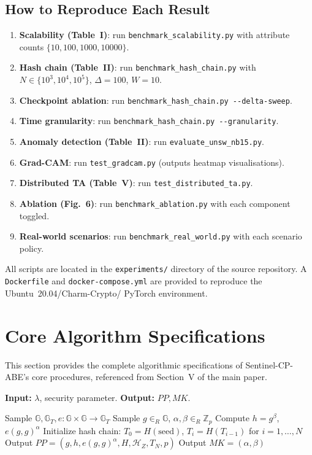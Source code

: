 \documentclass[lettersize,journal]{IEEEtran}
\begin{document}
\subsection{How to Reproduce Each Result}

\begin{enumerate}
    \item \textbf{Scalability (Table~I)}: run \verb|benchmark_scalability.py|
    with attribute counts $\{10,100,1000,10000\}$.
    \item \textbf{Hash chain (Table~II)}: run
    \verb|benchmark_hash_chain.py| with $N \in \{10^3, 10^4, 10^5\}$,
    $\Delta = 100$, $W = 10$.
    \item \textbf{Checkpoint ablation}: run
    \verb|benchmark_hash_chain.py --delta-sweep|.
    \item \textbf{Time granularity}: run
    \verb|benchmark_hash_chain.py --granularity|.
    \item \textbf{Anomaly detection (Table~II)}: run
    \verb|evaluate_unsw_nb15.py|.
    \item \textbf{Grad-CAM}: run \verb|test_gradcam.py|
    (outputs heatmap visualisations).
    \item \textbf{Distributed TA (Table~V)}: run
    \verb|test_distributed_ta.py|.
    \item \textbf{Ablation (Fig.~6)}: run \verb|benchmark_ablation.py|
    with each component toggled.
    \item \textbf{Real-world scenarios}: run
    \verb|benchmark_real_world.py| with each scenario policy.
\end{enumerate}

All scripts are located in the \verb|experiments/| directory of the
source repository. A \verb|Dockerfile| and \verb|docker-compose.yml|
are provided to reproduce the Ubuntu~20.04\slash Charm-Crypto\slash
PyTorch environment.

\section{Core Algorithm Specifications}
\label{sec:algorithms_supp}

This section provides the complete algorithmic specifications of
Sentinel-CP-ABE's core procedures, referenced from Section~V of the
main paper.

\begin{algorithm}[H]
\caption{Setup($\lambda$)}
\textbf{Input:} $\lambda$, security parameter. \textbf{Output:} $PP, MK$.\;
\begin{algorithmic}[1]
\STATE Sample $\mathbb{G}, \mathbb{G}_T, e: \mathbb{G} \times \mathbb{G} \rightarrow \mathbb{G}_T$
\STATE Sample $g \in_R \mathbb{G}$, $\alpha, \beta \in_R \mathbb{Z}_p$
\STATE Compute $h = g^\beta$, $e(g,g)^\alpha$
\STATE Initialize hash chain: $T_0 = H(\text{seed})$, $T_i = H(T_{i-1})$ for $i=1,\ldots,N$
\STATE Output $PP = (g, h, e(g,g)^\alpha, H, \mathcal{H}_Z, T_N, p)$
\STATE Output $MK = (\alpha, \beta)$
\end{algorithmic}
\label{alg:setup_supp}
\end{algorithm}
\end{document}
